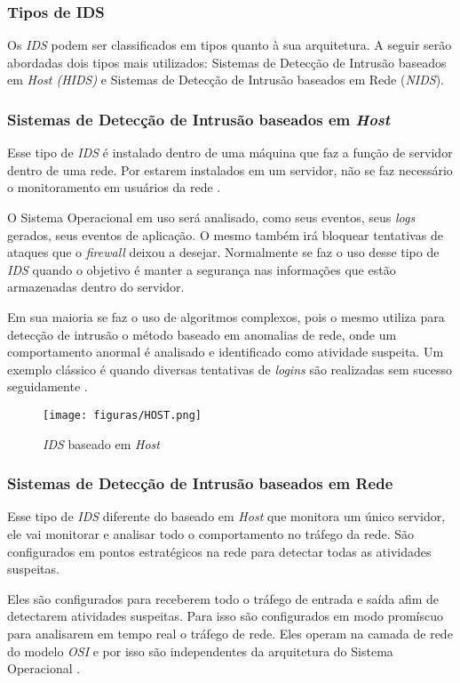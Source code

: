 \subsubsection{Tipos de IDS}
Os \textit{IDS} podem ser classificados em tipos quanto à sua arquitetura. A seguir serão abordadas dois tipos mais utilizados: Sistemas de Detecção de Intrusão baseados em \textit{Host (HIDS)} e Sistemas de Detecção de Intrusão baseados em Rede (\textit{NIDS}).

\subsubsection{Sistemas de Detecção de Intrusão baseados em \textit{Host}}
Esse tipo de \textit{IDS} é instalado dentro de uma máquina que faz a função de servidor dentro de uma rede. Por estarem instalados em um servidor, não se faz necessário o monitoramento em usuários da rede \cite{marcelo2003}.

O Sistema Operacional em uso será analisado, como seus eventos, seus \textit{logs} gerados, seus eventos de aplicação. O mesmo também irá bloquear tentativas de ataques que o \textit{firewall} deixou a desejar. Normalmente se faz o uso desse tipo de \textit{IDS} quando o objetivo é manter a segurança nas informações que estão armazenadas dentro do servidor.

Em sua maioria se faz o uso de algoritmos complexos, pois o mesmo utiliza para detecção de intrusão o método baseado em anomalias de rede, onde um comportamento anormal é analisado e identificado como atividade suspeita. Um exemplo clássico é quando diversas tentativas de \textit{logins} são realizadas sem sucesso seguidamente \cite{marcelo2003}.

\begin{figure}[!h]
\centering
\texttt{[image: figuras/HOST.png]}
\caption{\textit{IDS} baseado em \textit{Host}} 	
\end{figure}

\subsubsection{Sistemas de Detecção de Intrusão baseados em Rede}
Esse tipo de \textit{IDS} diferente do baseado em \textit{Host} que monitora um único servidor, ele vai monitorar e analisar todo o comportamento no tráfego da rede. São configurados em pontos estratégicos na rede para detectar todas as atividades suspeitas. 

Eles são configurados para receberem todo o tráfego de entrada e saída afim de detectarem atividades suspeitas. Para isso são configurados em modo promíscuo para analisarem em tempo real o tráfego de rede. Eles operam na camada de rede do modelo \textit{OSI} e por isso são independentes da arquitetura do Sistema Operacional \cite{marcelo2003}.

